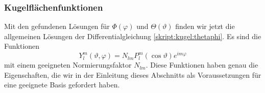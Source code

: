 \subsubsection{Kugelflächenfunktionen}
Mit den gefundenen Lösungen für $\Phi(\varphi)$ und $\Theta(\vartheta)$
finden wir jetzt die allgemeinen Lösungen 
der Differentialgleichung \eqref{skript:kugel:thetaphi}.
Es sind die Funktionen
\[
Y_l^m(\vartheta,\varphi)
=
N_{lm}
P_l^m(\cos\vartheta) e^{im\varphi}
\]
mit einem geeigneten Normierungsfaktor $N_{lm}$.
Diese Funktionen haben genau die Eigenschaften, die wir in der Einleitung
dieses Abschnitts als Voraussetzungen für eine geeignete Basis
gefordert haben.



